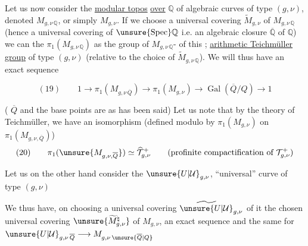 Let us now consider the \uline{modular topos} \uline{over} $\mathbb{Q}$ of algebraic curves of type $(g,\nu)$, denoted $M_{g,\nu\,\mathbb{Q}}$, or simply $M_{g,\nu}$. If we choose a universal covering $\widetilde{M}_{g,\nu}$ of $M_{g,\nu\,\mathbb{Q}}$ (hence a universal covering of $\unsure{\operatorname{Spec}}\mathbb{Q}$ i.e. an algebraic closure $\overline{\mathbb{Q}}$ of $\mathbb{Q}$) we can  the $\pi_1(M_{g,\nu\,\mathbb{Q}})$ as the group of $M_{g,\nu\,\mathbb{Q}}$- of this ;   \uline{arithmetic Teichmüller group} of type $(g,\nu)$ (relative to the choice of $\widetilde{M}_{g,\nu\,\mathbb{Q}}$). We will thus have an exact sequence



\[
(19)\qquad 1\longrightarrow \pi_1(M_{g,\nu\,\overline{Q}})
\longrightarrow \pi_1(M_{g,\nu})
\longrightarrow \operatorname{Gal}(\overline{Q}/Q)\longrightarrow 1
\]

( $\overline{Q}$ and the base points are  as has been said) Let us note that by the  theory of Teichmüller, we have an isomorphism (defined modulo   by $\pi_1(M_{g,\nu})$ on $\pi_1(M_{g,\nu,\overline{Q}})$)
\[
(20)\qquad \pi_1(\unsure{M_{g,\nu,\overline{Q}}})\simeq\widehat{\mathcal{T}}_{g,\nu}^{+}
\qquad (\text{profinite compactification of }\mathcal{T}_{g,\nu}^{+})
\]

Let us on the other hand consider the  $\unsure{U|\mathcal{U}}_{g,\nu}$, ``universal'' curve of type $(g,\nu)$

We thus have, on choosing a universal covering $\widetilde{\unsure{U|\mathcal{U}}}_{g,\nu}$ of it \uline{} the chosen universal covering $\unsure{\widetilde{M}_{g,\nu}^{\natural}}$ of $M_{g,\nu}$, an exact sequence
and the same for $\unsure{U|\mathcal{U}}_{g,\nu\,\overline{Q}}\longrightarrow M_{g,\nu\,\unsure{\overline{Q}|Q}}$

